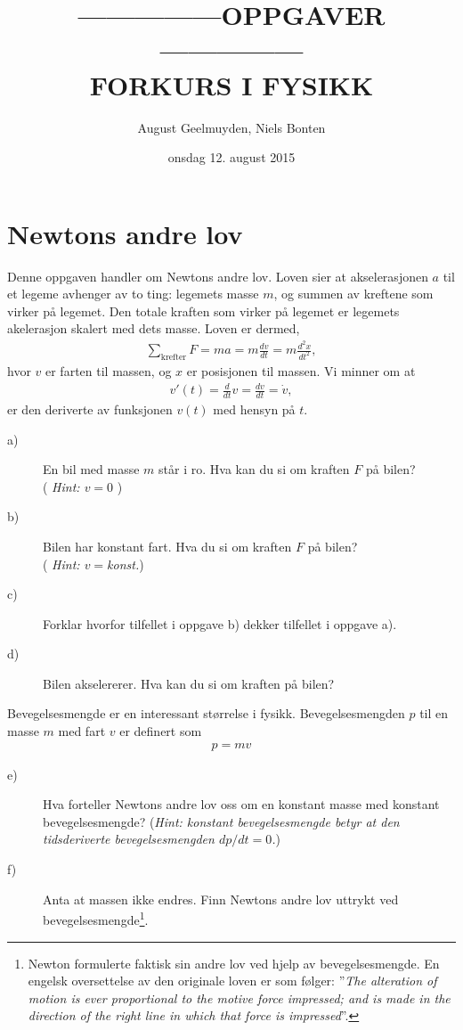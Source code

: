 \documentclass[a4paper, norsk, 12pt]{article}
\title{ 
\Huge ---------------OPPGAVER--------------- \\ \large FORKURS I FYSIKK}
\author{August Geelmuyden, Niels Bonten}
\date{onsdag 12. august 2015}
\newcommand{\EQU}[1] { \begin{equation*} \begin{split}
#1  
\end{split} \end{equation*} }
\begin{document}
  \maketitle



\section{Newtons andre lov}

Denne oppgaven handler om Newtons andre lov. Loven sier at akselerasjonen $a$ til et legeme avhenger av to ting: legemets masse $m$, og summen av kreftene som virker på legemet. Den totale kraften som virker på legemet er legemets akelerasjon skalert med dets masse. Loven er dermed,
\EQU{\sum_{\textrm{krefter}}F = ma = m\frac{dv}{dt} = m\frac{d^2x}{dt^2},}
hvor $v$ er farten til massen, og $x$ er posisjonen til massen. Vi minner om at
\EQU{v'(t) = \frac{d}{dt}v = \frac{dv}{dt} = \dot{v},}
er den deriverte av funksjonen $v(t)$ med hensyn på $t$.
\begin{description}
\item[a)] En bil med masse $m$ står i ro. Hva kan du si om kraften $F$ på bilen? \\
(\textit{ \footnotesize Hint: $v = 0$} )

\item[b)] Bilen har konstant fart. Hva du si om kraften $F$ på bilen? \\
(\textit{ \footnotesize Hint: $v = $konst.})

\item[c)] Forklar hvorfor tilfellet i oppgave b) dekker tilfellet i oppgave a).

\item[d)] Bilen akselererer. Hva kan du si om kraften på bilen?
\end{description}
Bevegelsesmengde er en interessant størrelse i fysikk. Bevegelsesmengden $p$ til en masse $m$ med fart $v$ er definert som
\EQU{p = mv}
\begin{description}

\item[e)] Hva forteller Newtons andre lov oss om en konstant masse med konstant bevegelsesmengde? 
(\textit{\footnotesize Hint: konstant bevegelsesmengde betyr at den tidsderiverte bevegelsesmengden $dp/dt = 0$.})

\item[f)] Anta at massen ikke endres. Finn Newtons andre lov uttrykt ved bevegelsesmengde\footnote{
Newton formulerte faktisk sin andre lov ved hjelp av bevegelsesmengde. En engelsk oversettelse av den originale loven er som følger: ''\textit{The alteration of motion is ever proportional to the motive force impressed; and is made in the direction of the right line in which that force is impressed}''.
}.

\end{description}
\end{document}
